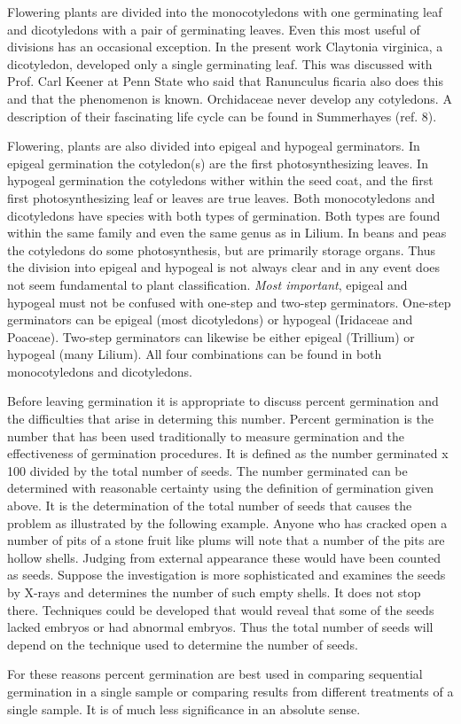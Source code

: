 Flowering plants are divided into the monocotyledons with one germinating leaf
and dicotyledons with a pair of germinating leaves. Even this most useful of
divisions has an occasional exception. In the present work Claytonia virginica,
a dicotyledon, developed only a single germinating leaf. This was discussed
with Prof. Carl Keener at Penn State who said that Ranunculus ficaria also does
this and that the phenomenon is known. Orchidaceae never develop any
cotyledons. A description of their fascinating life cycle can be found in
Summerhayes (ref. 8).

Flowering, plants are also divided into epigeal and hypogeal germinators. In
epigeal germination the cotyledon(s) are the first photosynthesizing leaves. In
hypogeal germination the cotyledons wither within the seed coat, and the first first
photosynthesizing leaf or leaves are true leaves. Both monocotyledons and
dicotyledons have species with both types of germination. Both types are found within
the same family and even the same genus as in Lilium. In beans and peas the
cotyledons do some photosynthesis, but are primarily storage organs. Thus the
division into epigeal and hypogeal is not always clear and in any event does not seem
fundamental to plant classification. \textit{Most important}, epigeal and hypogeal must not be
confused with one-step and two-step germinators. One-step germinators can be
epigeal (most dicotyledons) or hypogeal (Iridaceae and Poaceae). Two-step
germinators can likewise be either epigeal (Trillium) or hypogeal (many Lilium). All
four combinations can be found in both monocotyledons and dicotyledons.

Before leaving germination it is appropriate to discuss percent germination and
the difficulties that arise in determing this number. Percent germination is the number
that has been used traditionally to measure germination and the effectiveness of
germination procedures. It is defined as the number germinated x 100 divided by the
total number of seeds. The number germinated can be determined with reasonable
certainty using the definition of germination given above. It is the determination of the
total number of seeds that causes the problem as illustrated by the following example.
Anyone who has cracked open a number of pits of a stone fruit like plums will note that
a number of the pits are hollow shells. Judging from external appearance these would
have been counted as seeds. Suppose the investigation is more sophisticated and
examines the seeds by X-rays and determines the number of such empty shells. It
does not stop there. Techniques could be developed that would reveal that some of
the seeds lacked embryos or had abnormal embryos. Thus the total number of seeds
will depend on the technique used to determine the number of seeds.

For these reasons percent germination are best used in comparing sequential
germination in a single sample or comparing results from different treatments of a
single sample. It is of much less significance in an absolute sense.

